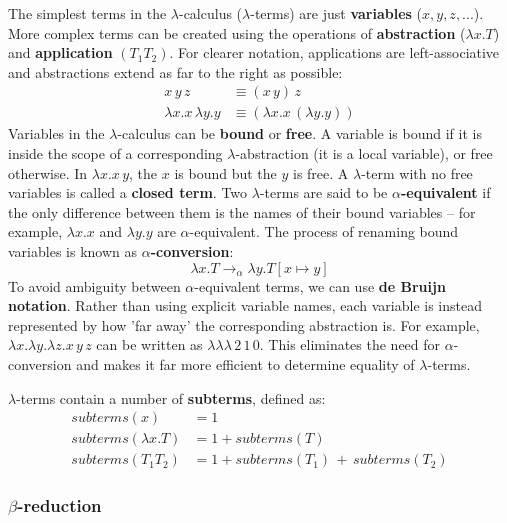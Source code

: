 \documentclass[12pt]{article}
\begin{document}
The simplest terms in the $\lambda$-calculus ($\lambda$-terms) are just \textbf{variables} ($x, y, z, ...$). More complex terms can be created using the operations of \textbf{abstraction} ($\lambda x. T$) and \textbf{application} $(T_1 T_2)$. For clearer notation, applications are left-associative and abstractions extend as far to the right as possible:
%
\begin{align*}
    x \, y \, z &\equiv (x \, y) \, z \\
    \lambda x. x \, \lambda y. y &\equiv (\lambda x. x \, (\lambda y. y))
\end{align*}
%
Variables in the $\lambda$-calculus can be \textbf{bound} or \textbf{free}. A variable is bound if it is inside the scope of a corresponding $\lambda$-abstraction (it is a local variable), or free otherwise. In $\lambda x. x \, y$, the $x$ is bound but the $y$ is free. A $\lambda$-term with no free variables is called a \textbf{closed term}. Two $\lambda$-terms are said to be \textbf{$\alpha$-equivalent} if the only difference between them is the names of their bound variables -- for example, $\lambda x. x$ and $\lambda y. y$ are $\alpha$-equivalent. The process of renaming bound variables is known as \textbf{$\alpha$-conversion}:
%
$$\lambda x. T \to_\alpha \lambda y. T[x \mapsto y]$$
%
To avoid ambiguity between $\alpha$-equivalent terms, we can use \textbf{de Bruijn notation}. Rather than using explicit variable names, each variable is instead represented by how 'far away' the corresponding abstraction is. For example, $\lambda x. \lambda y. \lambda z. x \, y \, z$ can be written as $\lambda\lambda\lambda \, 2 \, 1 \, 0$. This eliminates the need for $\alpha$-conversion and makes it far more efficient to determine equality of $\lambda$-terms.

$\lambda$-terms contain a number of \textbf{subterms}, defined as:
%
\begin{align*}
    subterms(x) &= 1 \\
    subterms(\lambda x. T) &= 1 + subterms(T) \\
    subterms(T_1 T_2) &= 1 + subterms(T_1) \, + \, subterms(T_2)
\end{align*}

\subsubsection{\texorpdfstring{$\beta$}{Beta}-reduction}
\end{document}
